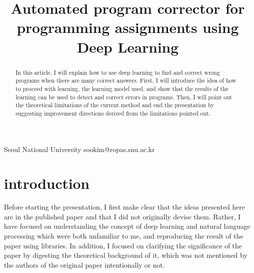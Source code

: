 \documentclass[nocopyrightspace]{sigplanconf}
\begin{document}
\setlength{\pdfpageheight}{\paperheight}
\setlength{\pdfpagewidth}{\paperwidth}






\title{Automated program corrector for programming assignments using Deep Learning}

           {Seoul National University}
           {sookim@ropas.snu.ac.kr}

\maketitle

\begin{abstract}

In this article, I will explain how to use deep learning to find and correct wrong programs when there are many correct answers. First, I will introduce the idea of how to proceed with learning, the learning model used, and show that the results of the learning can be used to detect and correct errors in programs. Then, I will point out the theoretical limitations of the current method and end the presentation by suggesting improvement directions derived from the limitations pointed out.

\end{abstract}

\section{introduction}

Before starting the presentation, I first make clear that the ideas presented here are in the published paper\cite{pu2016sk_p} and that I did not originally devise them. Rather, I have focused on understanding the concept of deep learning and natural language processing which were both unfamiliar to me, and reproducing the result of the paper using libraries. In addition, I focused on clarifying the significance of the paper by digesting the theoretical background of it, which was not mentioned by the authors of the original paper intentionally or not.
\end{document}

